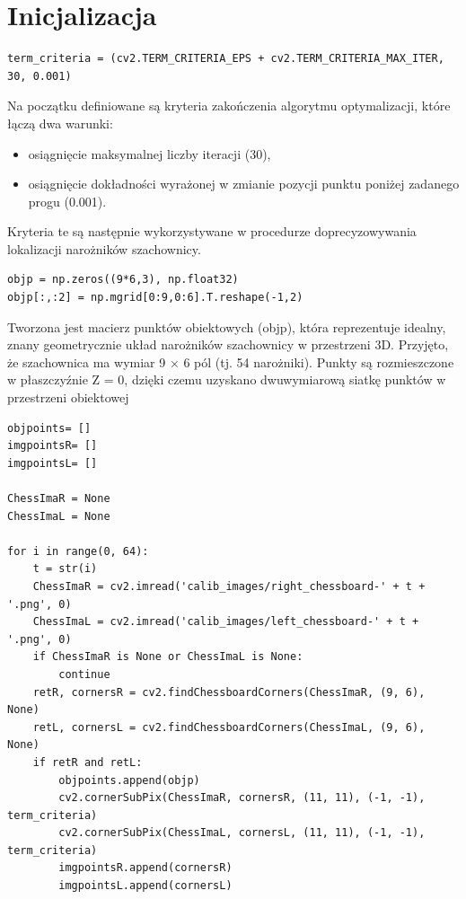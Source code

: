 \documentclass[magisterska]{pracadypl}
\begin{document}
\section*{Inicjalizacja}

\begin{lstlisting}[style=mypython]
term_criteria = (cv2.TERM_CRITERIA_EPS + cv2.TERM_CRITERIA_MAX_ITER, 30, 0.001)
\end{lstlisting}

Na początku definiowane są kryteria zakończenia algorytmu optymalizacji, które łączą dwa warunki:

\begin{itemize}
    \item osiągnięcie maksymalnej liczby iteracji (30),
    \item osiągnięcie dokładności wyrażonej w zmianie pozycji punktu poniżej zadanego progu (0.001).
\end{itemize}

Kryteria te są następnie wykorzystywane w procedurze doprecyzowywania lokalizacji narożników szachownicy.

\begin{lstlisting}[style=mypython]
objp = np.zeros((9*6,3), np.float32)
objp[:,:2] = np.mgrid[0:9,0:6].T.reshape(-1,2)
\end{lstlisting}

Tworzona jest macierz punktów obiektowych (objp), która reprezentuje idealny, znany geometrycznie układ narożników szachownicy w przestrzeni 3D. Przyjęto, że szachownica ma wymiar 9 × 6 pól (tj. 54 narożniki). Punkty są rozmieszczone w płaszczyźnie Z = 0, dzięki czemu uzyskano dwuwymiarową siatkę punktów w przestrzeni obiektowej

\begin{lstlisting}[style=mypython]
objpoints= []   
imgpointsR= []   
imgpointsL= []

ChessImaR = None
ChessImaL = None

for i in range(0, 64):
    t = str(i)
    ChessImaR = cv2.imread('calib_images/right_chessboard-' + t + '.png', 0)
    ChessImaL = cv2.imread('calib_images/left_chessboard-' + t + '.png', 0)
    if ChessImaR is None or ChessImaL is None:
        continue  
    retR, cornersR = cv2.findChessboardCorners(ChessImaR, (9, 6), None)
    retL, cornersL = cv2.findChessboardCorners(ChessImaL, (9, 6), None)
    if retR and retL:
        objpoints.append(objp)
        cv2.cornerSubPix(ChessImaR, cornersR, (11, 11), (-1, -1), term_criteria)
        cv2.cornerSubPix(ChessImaL, cornersL, (11, 11), (-1, -1), term_criteria)
        imgpointsR.append(cornersR)
        imgpointsL.append(cornersL)
\end{lstlisting}
\end{document}

